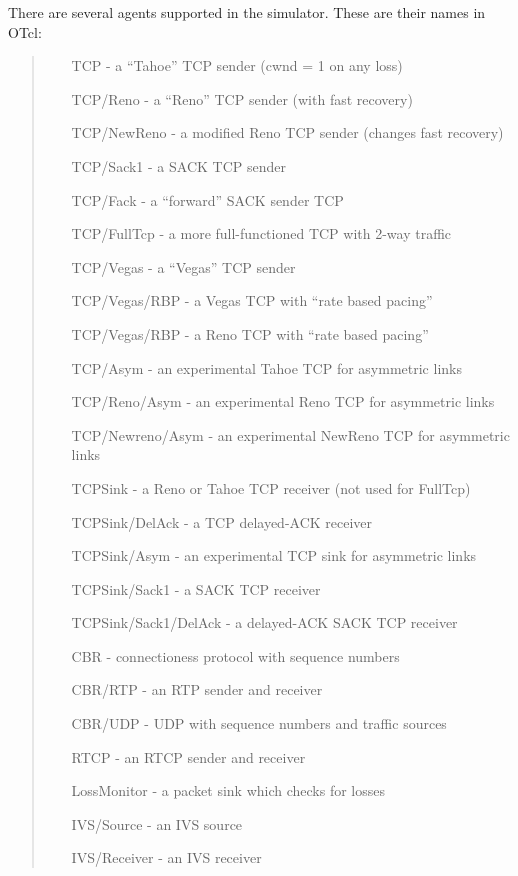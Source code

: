 There are several agents supported in the simulator.
These are their names in OTcl:
\begin{quote}
\begin{itemize}
        \item[TCP] - a ``Tahoe'' TCP sender (cwnd = 1 on any loss)
        \item[TCP/Reno] - a ``Reno'' TCP sender  (with fast recovery)
        \item[TCP/NewReno] - a modified Reno TCP sender (changes fast recovery)
        \item[TCP/Sack1] - a SACK TCP sender
        \item[TCP/Fack] - a ``forward'' SACK sender TCP 
	\item[TCP/FullTcp] - a more full-functioned TCP with 2-way traffic
	\item[TCP/Vegas] - a ``Vegas'' TCP sender
	\item[TCP/Vegas/RBP] - a Vegas TCP with ``rate based pacing''
	\item[TCP/Vegas/RBP] - a Reno TCP with ``rate based pacing''
	\item[TCP/Asym] - an experimental Tahoe TCP for asymmetric links
	\item[TCP/Reno/Asym] - an experimental Reno TCP for asymmetric links
	\item[TCP/Newreno/Asym] - an experimental NewReno TCP for asymmetric links
        \item[TCPSink] - a Reno or Tahoe TCP receiver (not used for FullTcp)
        \item[TCPSink/DelAck] - a TCP delayed-ACK receiver
        \item[TCPSink/Asym] - an experimental  TCP sink for asymmetric links
        \item[TCPSink/Sack1] - a SACK TCP receiver
	\item[TCPSink/Sack1/DelAck] - a delayed-ACK SACK TCP receiver

        \item[CBR] - connectioness protocol with sequence numbers
        \item[CBR/RTP] - an RTP sender and receiver
	\item[CBR/UDP] - UDP with sequence numbers and traffic sources
        \item[RTCP] - an RTCP sender and receiver

	\item[LossMonitor] - a packet sink which checks for losses

	\item[IVS/Source] - an IVS source
	\item[IVS/Receiver] - an IVS receiver


\end{itemize}
\end{quote}

